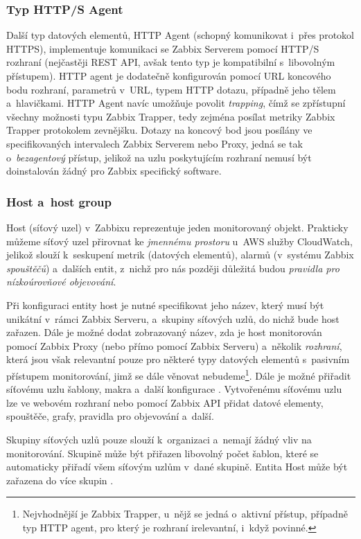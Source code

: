 \documentclass[czech, ing, kiv, he, iso690]{fasthesis}
\begin{document}
\subsubsection{Typ HTTP/S Agent}
Další typ datových elementů, HTTP Agent (schopný komunikovat i~přes protokol HTTPS), implementuje komunikaci se Zabbix Serverem pomocí HTTP/S rozhraní (nejčastěji REST API, avšak tento typ je kompatibilní s~libovolným přístupem). HTTP agent je dodatečně konfigurován pomocí URL koncového bodu rozhraní, parametrů v~URL, typem HTTP dotazu, případně jeho tělem a~hlavičkami. HTTP Agent navíc umožňuje povolit \emph{trapping}, čímž se zpřístupní všechny možnosti typu Zabbix Trapper, tedy zejména posílat metriky Zabbix Trapper protokolem zevnějšku. Dotazy na koncový bod jsou posílány ve specifikovaných intervalech Zabbix Serverem nebo Proxy, jedná se tak o~\emph{bezagentový} přístup, jelikož na uzlu poskytujícím rozhraní nemusí být doinstalován žádný pro Zabbix specifický software.


\subsubsection{Host a~host group}
Host (síťový uzel) v~Zabbixu reprezentuje jeden monitorovaný objekt. Prakticky můžeme síťový uzel přirovnat ke \emph{jmennému prostoru} u~AWS služby CloudWatch, jelikož slouží k~seskupení metrik (datových elementů), alarmů (v~systému Zabbix \emph{spouštěčů}) a~dalších entit, z~nichž pro nás později důležitá budou \emph{pravidla pro nízkoúrovňové objevování}. 

Při konfiguraci entity host je nutné specifikovat jeho název, který musí být unikátní v~rámci Zabbix Serveru, a~skupiny síťových uzlů, do nichž bude host zařazen. Dále je možné dodat zobrazovaný název, zda je host monitorován pomocí Zabbix Proxy (nebo přímo pomocí Zabbix Serveru) a~několik \emph{rozhraní}, která jsou však relevantní pouze pro některé typy datových elementů s~pasivním přístupem monitorování, jimž se dále věnovat nebudeme\footnote{Nejvhodnější je Zabbix Trapper, u~nějž se jedná o~aktivní přístup, případně typ HTTP agent, pro který je rozhraní irelevantní, i~když povinné.}. Dále je možné přiřadit síťovému uzlu šablony, makra a~další konfigurace \cite{docs.zabbix}. Vytvořenému síťovému uzlu lze ve webovém rozhraní nebo pomocí Zabbix API přidat datové elementy, spouštěče, grafy, pravidla pro objevování a~další. 

Skupiny síťových uzlů pouze slouží k~organizaci a~nemají žádný vliv na monitorování. Skupině může být přiřazen libovolný počet šablon, které se automaticky přiřadí všem síťovým uzlům v~dané skupině. Entita Host může být zařazena do více skupin \cite{docs.zabbix}.
\end{document}
